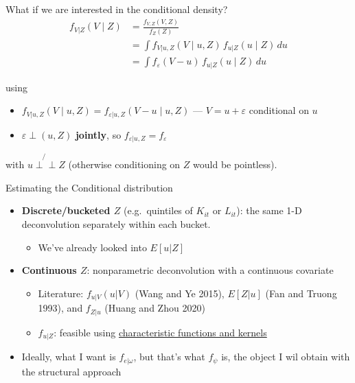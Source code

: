 \documentclass[
  ignorenonframetext,
  aspectratio=169,
]{beamer}
\providecommand{\tightlist}{%
  \setlength{\itemsep}{0pt}\setlength{\parskip}{0pt}}
\newcommand{\ind}{{\perp\!\!\!\perp}}
\begin{document}
\begin{frame}{What if we are interested in the conditional density?}
\protect{}\label{what-if-we-are-interested-in-the-conditional-density}
\[
\begin{aligned}
    f_{V|Z}(V\mid Z)&=\frac{f_{V,Z}(V,Z)}{f_Z(Z)}\\
    &=\int f_{V|u,Z}(V\mid u,Z)\,f_{u|Z}(u\mid Z)\,du\\
    &=\int f_\varepsilon(V-u)\,f_{u|Z}(u\mid Z)\,du
\end{aligned}
\]

using

\begin{itemize}
\tightlist
\item
  \(f_{V|u,Z}(V\mid u,Z)=f_{\varepsilon|u,Z}(V-u\mid u,Z)\) ---
  \(V=u+\varepsilon\) conditional on \(u\)
\item
  \(\varepsilon\perp(u,Z)\) \textbf{jointly}, so
  \(f_{\varepsilon|u,Z}=f_\varepsilon\)
\end{itemize}

with \(u\not\ind Z\) (otherwise conditioning on \(Z\) would be
pointless).
\end{frame}

\begin{frame}{Estimating the Conditional distribution}
\protect{}\label{sec-estimating-cond-deconv}
\begin{itemize}
\tightlist
\item
  \textbf{Discrete/bucketed \(Z\)} (e.g.~quintiles of \(K_{it}\) or
  \(L_{it}\)): the same 1-D deconvolution separately within each bucket.

  \begin{itemize}
  \tightlist
  \item
    We've already looked into \(E[u|Z]\)
  \end{itemize}
\item
  \textbf{Continuous \(Z\)}: nonparametric deconvolution with a
  continuous covariate

  \begin{itemize}
  \tightlist
  \item
    Literature: \(f_{u|V}(u|V)\) (Wang and Ye 2015), \(E[Z|u]\) (Fan and
    Truong 1993), and \(f_{Z|u}\) (Huang and Zhou 2020)
  \item
    \(f_{u|Z}\): feasible using
    \hyperlink{sec-cond-deconv-appendix}{characteristic functions and
    kernels}
  \end{itemize}
\item
  Ideally, what I want is \(f_{e|\omega}\), but that's what \(f_\psi\)
  is, the object I wil obtain with the structural approach
\end{itemize}
\end{frame}
\end{document}
